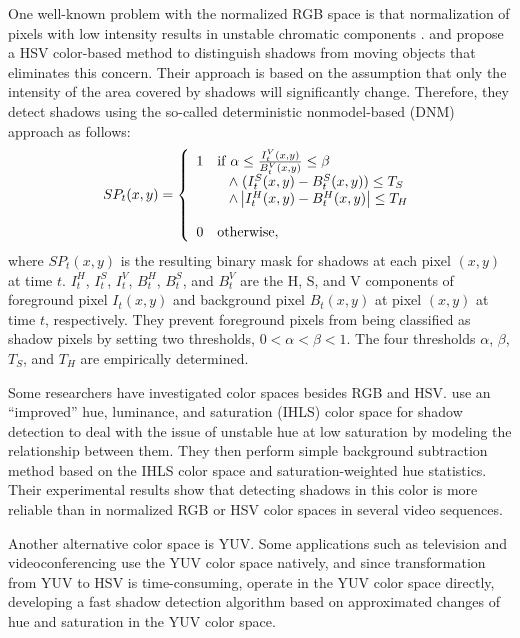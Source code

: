 One well-known problem with the normalized RGB space is that
normalization of pixels with low intensity results in unstable
chromatic
components . 
and  propose a HSV color-based method to
distinguish shadows from moving objects that eliminates this
concern. Their approach is based on the assumption that only the
intensity of the area covered by shadows will significantly
change. Therefore, they detect shadows using the so-called
deterministic nonmodel-based (DNM) approach as follows:
\[
  SP_t (x,y) = \left\{ 
  \begin{array}{ll}
    1 & {\rm if} \; \alpha \le \frac{{I_t^V (x,y)}}{{B_t^V (x,y)}} \le \beta\\ 
    & \;\;\; \wedge \; (I_t^S (x,y) - B_t^S (x,y)) \le T_S  \\ 
    & \;\;\; \wedge \left| {I_t^H (x,y) - B_t^H (x,y)} \right| \le T_H\\ \\
    0 & {\rm otherwise}, \\ 
  \end{array} \right.
\]
where $SP_t(x,y)$ is the resulting binary mask for shadows at each
pixel $(x,y)$ at time $t$.  $I_t^H$, $I_t^S$, $I_t^V$, $B_t^H$,
$B_t^S$, and $B_t^V$ are the H, S, and V components of foreground
pixel $I_t(x,y)$ and background pixel $B_t(x, y)$ at pixel $(x,y)$ at
time $t$, respectively.  They prevent foreground pixels from being
classified as shadow pixels by setting two thresholds, $0 < \alpha <
\beta < 1$.  The four thresholds $\alpha$, $\beta$, $T_S$, and $T_H$
are empirically determined.

Some researchers have investigated color spaces besides RGB and
HSV.  use an ``improved'' hue, luminance, and
saturation (IHLS) color space for shadow detection to deal with the
issue of unstable hue at low saturation by modeling the relationship
between them. They then perform simple background subtraction method
based on the IHLS color space and saturation-weighted hue statistics.
Their experimental results show that detecting shadows in this color
is more reliable than in normalized RGB or HSV color spaces in several
video sequences.

Another alternative color space is YUV.  Some applications such as
television and videoconferencing use the YUV color space natively, and
since transformation from YUV to HSV is
time-consuming,  operate in the YUV color
space directly, developing a fast shadow detection algorithm based on
approximated changes of hue and saturation in the YUV color space.

